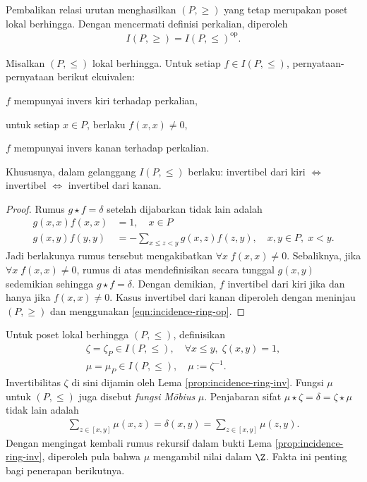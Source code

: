 Pembalikan relasi urutan menghasilkan $(P, \geq)$ yang tetap merupakan poset lokal berhingga. Dengan mencermati definisi perkalian, diperoleh
\begin{gather}\label{eqn:incidence-ring-op}
	I(P,\geq) = I(P, \leq)^\text{op}.
\end{gather}

\begin{lemma}\label{prop:incidence-ring-inv}
	Misalkan $(P, \leq)$ lokal berhingga. Untuk setiap $f \in I(P, \leq)$, pernyataan-pernyataan berikut ekuivalen:
	\begin{compactitem}
		\item $f$ mempunyai invers kiri terhadap perkalian,
		\item untuk setiap $x \in P$, berlaku $f(x,x) \neq 0$,
		\item $f$ mempunyai invers kanan terhadap perkalian.
	\end{compactitem}
	Khususnya, dalam gelanggang $I(P, \leq)$ berlaku: invertibel dari kiri $\iff$ invertibel $\iff$ invertibel dari kanan.
\end{lemma}
\begin{proof}
	Rumus $g \star f = \delta$ setelah dijabarkan tidak lain adalah
	\begin{align*}
		g(x,x)f(x,x) & =1, \quad x \in P \\
		g(x,y) f(y,y) & = - \sum_{x \leq z < y} g(x,z) f(z,y), \quad x,y \in P, \; x < y.
	\end{align*}
	Jadi berlakunya rumus tersebut mengakibatkan $\forall x \; f(x,x) \neq 0$. Sebaliknya, jika $\forall x \; f(x,x) \neq 0$, rumus di atas mendefinisikan secara tunggal $g(x,y)$ sedemikian sehingga $g \star f = \delta$. Dengan demikian, $f$ invertibel dari kiri jika dan hanya jika $f(x,x) \neq 0$. Kasus invertibel dari kanan diperoleh dengan meninjau $(P,\geq)$ dan menggunakan \eqref{eqn:incidence-ring-op}.
\end{proof}

Untuk poset lokal berhingga $(P,\leq)$, definisikan
\begin{gather*}
	\zeta = \zeta_P \in I(P, \leq), \quad \forall x \leq y, \; \zeta(x,y) = 1, \\
	\mu = \mu_P \in I(P, \leq), \quad \mu := \zeta^{-1}.
\end{gather*}
Invertibilitas $\zeta$ di sini dijamin oleh Lema \ref{prop:incidence-ring-inv}. Fungsi $\mu$ untuk $(P, \leq)$ juga disebut \emph{fungsi Möbius} $\mu$. Penjabaran sifat $\mu \star \zeta = \delta = \zeta \star \mu$ tidak lain adalah
\begin{gather}\label{eqn:Mobius-eq}
	\sum_{z \in [x,y]} \mu(x,z) = \delta(x,y) = \sum_{z \in [x,y]} \mu(z,y).
\end{gather}
Dengan mengingat kembali rumus rekursif dalam bukti Lema \ref{prop:incidence-ring-inv}, diperoleh pula bahwa $\mu$ mengambil nilai dalam $\Z$. Fakta ini penting bagi penerapan berikutnya.

